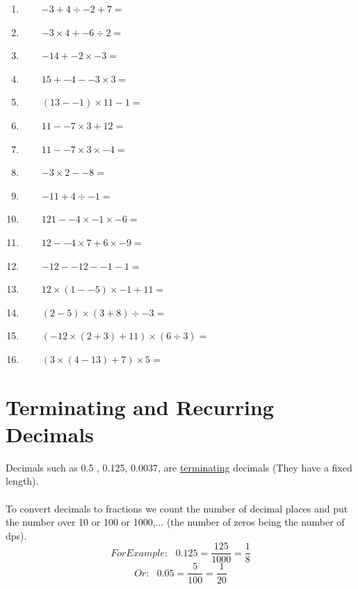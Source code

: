 \documentclass[a4paper,12pt]{article}
\begin{document}
\begin{tcolorbox}[colback=red!0!white, colframe=gray ,title=\subsubsection{Evaluate the following.}\label{op2}]
	\begin{multicols}{2}
		\begin{enumerate}[label=\footnotesize \roman*)]
			\item ~~~~$-3+4\div-2+7=$
			\item ~~~~$-3\times4+-6\div2=$
			\item ~~~~$-14+-2\times-3=$
			\item ~~~~$15+-4--3\times3=$
			\item ~~~~$(13--1)\times11-1=$
			\item ~~~~$11--7\times3+12=$
			\item ~~~~$11--7\times3\times-4=$
			\item ~~~~$-3\times2--8=$
			\item ~~~~$-11+4\div-1=$
			\item ~~~~$121--4\times-1\times-6=$
			\item ~~~~$12--4\times7+6\times-9=$
			\item ~~~~$-12--12--1-1=$
			\item ~~~~$12\times(1--5)\times-1+11=$
			\item ~~~~$(2-5)\times(3+8)\div-3=$
			\item ~~~~$(-12\times(2+3)+11)\times(6\div3)=$
			\item ~~~~$(3\times(4-13)+7)\times5=$
		\end{enumerate}
	\end{multicols}
\end{tcolorbox}\vspace{0.75cm}
\newpage


\section{Terminating and Recurring Decimals}
Decimals such as 0.5 , 0.125, 0.0037, are \underline{terminating} decimals (They have a fixed length).
\\\\
To convert decimals to fractions we count the number of decimal places and put the number over 10 or 100 or 1000,... (the number of zeros being the number of dps).
 $$For Example:~~~ 0.125=\frac{125}{1000}=\frac{1}{8}$$
  $$Or:~~~ 0.05=\frac{5}{100}=\frac{1}{20}$$
\end{document}
